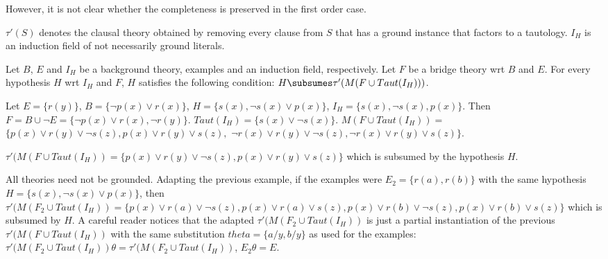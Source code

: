 However, it is not clear whether the completeness is preserved in the first order case.

$\tau'(S)$ denotes the clausal theory obtained by removing every clause from $S$ that has a ground instance that factors to a tautology. $I_H$ is an induction field of not necessarily ground literals.

\begin{conjecture}\label{subsumptionConjectureFirstOrder}
Let $B$, $E$ and $I_H$ be a background theory, examples and an induction field, respectively. Let $F$ be a bridge theory wrt $B$ and $E$. For every hypothesis $H$ wrt $I_H$ and $F$, $H$ satisfies the following condition:
$H \subsumes \tau'(M(F \cup Taut(I_H)))$.
\end{conjecture}

\begin{exmp}
Let $E=\{r(y)\}$,
$B=\{\neg p(x) \vee r(x)\}$,
$H=\{s(x), \neg s(x) \vee p(x)\}$,
$I_H=\{s(x), \neg s(x), p(x)\}$.
Then $F=B \cup \neg E=\{\neg p(x) \vee r(x), \neg r(y) \}$.
$Taut(I_H)=\{s(x) \vee \neg s(x)\}$.
$M(F \cup Taut(I_H))=$
$\{p(x) \vee r(y) \vee \neg s(z), p(x) \vee r(y) \vee s(z),$
$\neg r(x) \vee r(y) \vee \neg s(z),\neg r(x) \vee r(y) \vee s(z) \}$.

$\tau'(M(F \cup Taut(I_H))=\{p(x) \vee r(y) \vee \neg s(z), p(x) \vee r(y) \vee s(z)\}$ which is subsumed by the hypothesis $H$.
\end{exmp}

\begin{exmp}
All theories need not be grounded. Adapting the previous example, if the examples were
$E_2=\{r(a), r(b)\}$ with the same hypothesis
$H=\{s(x), \neg s(x) \vee p(x)\}$, then
$\tau'(M(F_2 \cup Taut(I_H))=\{p(x) \vee r(a) \vee \neg s(z), p(x) \vee r(a) \vee s(z), p(x) \vee r(b) \vee \neg s(z), p(x) \vee r(b) \vee s(z) \}$ which is subsumed by $H$. A careful reader notices that the adapted $\tau'(M(F_2 \cup Taut(I_H))$ is just a partial instantiation of the previous
$\tau'(M(F \cup Taut(I_H))$ with the same substitution
$theta=\{a / y, b / y\}$ as used for the examples:
$\tau'(M(F_2 \cup Taut(I_H)) \theta=\tau'(M(F_2 \cup Taut(I_H))$,
$E_2 \theta = E$.
\end{exmp}
